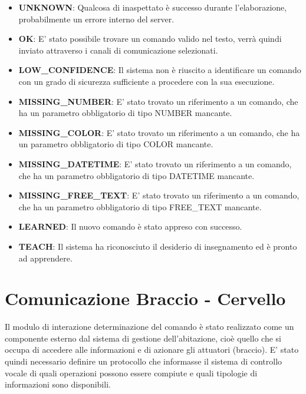 \documentclass[twoside]{supsistudent}
\begin{document}
\begin{itemize}
	\item \textbf{UNKNOWN}: Qualcosa di inaspettato è successo durante l'elaborazione, probabilmente un errore interno del server.
	\item \textbf{OK}: E' stato possibile trovare un comando valido nel testo, verrà quindi inviato attraverso i canali di comunicazione selezionati.
	\item \textbf{LOW\_CONFIDENCE}: Il sistema non è riuscito a identificare un comando con un grado di sicurezza sufficiente a procedere con la sua esecuzione.
	\item \textbf{MISSING\_NUMBER}: E' stato trovato un riferimento a un comando, che ha un parametro obbligatorio di tipo NUMBER mancante.
	\item \textbf{MISSING\_COLOR}: E' stato trovato un riferimento a un comando, che ha un parametro obbligatorio di tipo COLOR mancante.
	\item \textbf{MISSING\_DATETIME}: E' stato trovato un riferimento a un comando, che ha un parametro obbligatorio di tipo DATETIME mancante.
	\item \textbf{MISSING\_FREE\_TEXT}: E' stato trovato un riferimento a un comando, che ha un parametro obbligatorio di tipo FREE\_TEXT mancante.
	\item \textbf{LEARNED}: Il nuovo comando è stato appreso con successo.
	\item \textbf{TEACH}: Il sistema ha riconosciuto il desiderio di insegnamento ed è pronto ad apprendere.
\end{itemize}

\chapter{Comunicazione Braccio - Cervello }
Il modulo di interazione determinazione del comando è stato realizzato come un componente esterno dal sistema di gestione dell'abitazione, cioè quello che si occupa di accedere alle informazioni e di azionare gli attuatori (braccio). E' stato quindi necessario definire un protocollo che informasse il sistema di controllo vocale di quali operazioni possono essere compiute e quali tipologie di informazioni sono disponibili.
\end{document}
